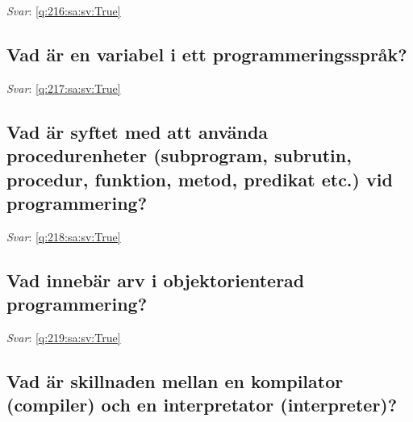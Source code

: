 \documentclass[a4paper,11pt,oneside]{article}
\begin{document}
\begin{sloppypar}
\textit{Svar}: \autoref{q:216:sa:sv:True}



\subsection{Vad \"ar en variabel i ett programmeringsspr\r{a}k?}

\label{q:217:sa:sv:False}

\vspace{2cm}

\noindent\makebox[\textwidth]{\hrulefill}

\vspace{1cm}

\textit{Svar}: \autoref{q:217:sa:sv:True}



\subsection{Vad \"ar syftet med att anv\"anda procedurenheter (subprogram, subrutin, procedur, funktion, metod, predikat etc.) vid programmering?}

\label{q:218:sa:sv:False}

\vspace{2cm}

\noindent\makebox[\textwidth]{\hrulefill}

\vspace{1cm}

\textit{Svar}: \autoref{q:218:sa:sv:True}



\subsection{Vad inneb\"ar arv i objektorienterad programmering?}

\label{q:219:sa:sv:False}

\vspace{2cm}

\noindent\makebox[\textwidth]{\hrulefill}

\vspace{1cm}

\textit{Svar}: \autoref{q:219:sa:sv:True}



\subsection{Vad \"ar skillnaden mellan en kompilator (compiler) och en interpretator (interpreter)?}


\end{sloppypar}
\end{document}
